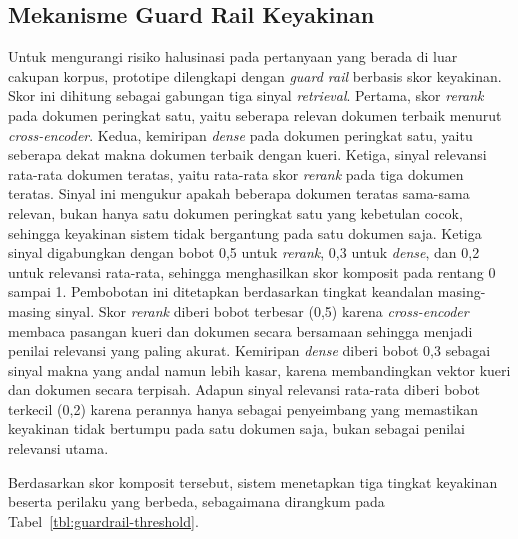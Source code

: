 \subsection{Mekanisme Guard Rail Keyakinan}
\label{subsec:impl-guardrail}

Untuk mengurangi risiko halusinasi pada pertanyaan yang berada di luar cakupan korpus, prototipe dilengkapi dengan \textit{guard rail} berbasis skor keyakinan. Skor ini dihitung sebagai gabungan tiga sinyal \textit{retrieval}. Pertama, skor \textit{rerank} pada dokumen peringkat satu, yaitu seberapa relevan dokumen terbaik menurut \textit{cross-encoder}. Kedua, kemiripan \textit{dense} pada dokumen peringkat satu, yaitu seberapa dekat makna dokumen terbaik dengan kueri. Ketiga, sinyal relevansi rata-rata dokumen teratas, yaitu rata-rata skor \textit{rerank} pada tiga dokumen teratas. Sinyal ini mengukur apakah beberapa dokumen teratas sama-sama relevan, bukan hanya satu dokumen peringkat satu yang kebetulan cocok, sehingga keyakinan sistem tidak bergantung pada satu dokumen saja. Ketiga sinyal digabungkan dengan bobot 0{,}5 untuk \textit{rerank}, 0{,}3 untuk \textit{dense}, dan 0{,}2 untuk relevansi rata-rata, sehingga menghasilkan skor komposit pada rentang 0 sampai 1. Pembobotan ini ditetapkan berdasarkan tingkat keandalan masing-masing sinyal. Skor \textit{rerank} diberi bobot terbesar (0{,}5) karena \textit{cross-encoder} membaca pasangan kueri dan dokumen secara bersamaan sehingga menjadi penilai relevansi yang paling akurat. Kemiripan \textit{dense} diberi bobot 0{,}3 sebagai sinyal makna yang andal namun lebih kasar, karena membandingkan vektor kueri dan dokumen secara terpisah. Adapun sinyal relevansi rata-rata diberi bobot terkecil (0{,}2) karena perannya hanya sebagai penyeimbang yang memastikan keyakinan tidak bertumpu pada satu dokumen saja, bukan sebagai penilai relevansi utama.

Berdasarkan skor komposit tersebut, sistem menetapkan tiga tingkat keyakinan beserta perilaku yang berbeda, sebagaimana dirangkum pada Tabel~\ref{tbl:guardrail-threshold}.

